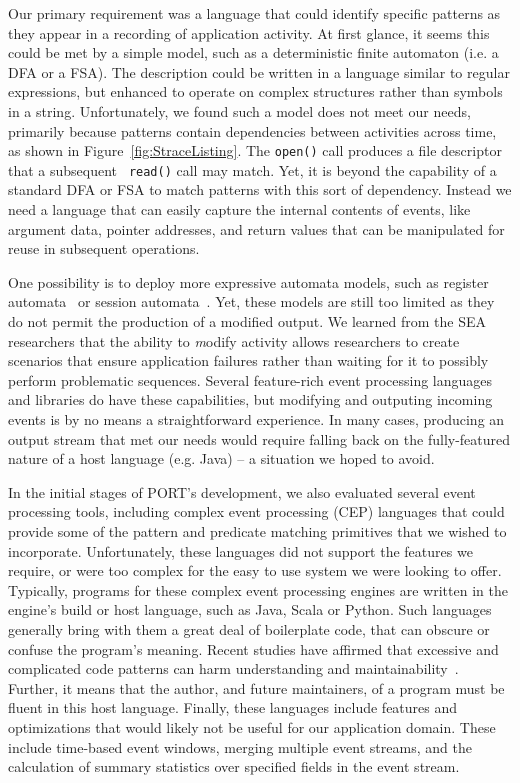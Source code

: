 Our primary requirement was a language that could identify specific
patterns as they appear in a recording of application activity.
At first glance, it seems this could be met by a simple model,
such as a deterministic finite automaton (i.e. a DFA or a FSA).
The description could be written
in a language similar to
regular expressions, but enhanced to operate on complex
structures rather than symbols in a string.
Unfortunately, we found such a model does not meet our needs, primarily because patterns contain dependencies
between activities
across time,
as shown in Figure~\ref{fig:StraceListing}.
The {\tt open()} call produces a file descriptor that a subsequent {\tt
read()} call may match.
Yet, it is beyond the capability
of a standard DFA or FSA to match patterns with this sort of dependency. 
Instead we need a language
that can easily capture
the internal contents of events,
like argument data,
pointer addresses,
and return values that can be
manipulated for
reuse in subsequent operations.

One possibility is to deploy more expressive automata models, such as register automata~\cite{DBLP:journals/tcs/KaminskiF94} or session automata~\cite{DBLP:journals/corr/BolligHLM14}. Yet, these models are still too limited as
they do not permit  the production of a modified output. 
We learned from the  SEA researchers that the ability to
{\textit modify} activity allows researchers to create scenarios  that ensure
application failures rather than  waiting for it to possibly  perform
problematic sequences.
Several feature-rich event processing
languages and libraries do have these capabilities, but
modifying and outputing
incoming events
is by no means a straightforward experience.
In many cases, producing an output stream that met
our needs would require
falling back on the fully-featured nature of a host language (e.g. Java) -- a situation
we hoped to avoid.

In the initial stages of PORT's development, we also
evaluated several event processing tools,
including
complex event processing (CEP) languages that
could
provide some of the pattern and predicate matching primitives
that we wished to
incorporate.
Unfortunately,
these languages did not
support  the features
we require,
or were too complex
for the easy to use  system we were looking to offer.
Typically,
programs for these complex event processing engines are
written in the engine's build or host language,
such as Java,
Scala or
Python.
Such languages generally bring with them a great deal of boilerplate code,
that can obscure or confuse
the program's meaning.
Recent studies
have affirmed that excessive and complicated code
patterns can harm
understanding and
maintainability~\cite{misunderstandings}.
Further,
it means that the author,
and future maintainers,
of a
program must be fluent in this host language.
Finally,
these languages include features and optimizations
that would likely not be useful for our application domain.
These include time-based event windows,
merging multiple event streams,
and the calculation of
summary statistics over specified fields in the event stream.


